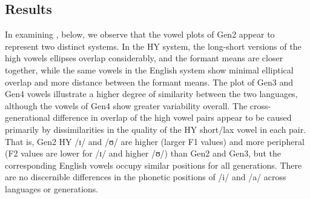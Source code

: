 \documentclass[output=paper]{langsci/langscibook}
\begin{document}
 
 \subsection{Results}
\label{sec:nove:4.3}

In examining , below, we observe that the vowel plots of Gen2 appear to represent two distinct systems. In the HY system, the long-short versions of the high vowels ellipses overlap considerably, and the formant means are closer together, while the same vowels in the English system show minimal elliptical overlap and more distance between the formant means. The plot of Gen3 and Gen4 vowels illustrate a higher degree of similarity between the two languages, although the vowels of Gen4 show greater variability overall. The cross-generational difference in overlap of the high vowel pairs appear to be caused primarily by dissimilarities in the quality of the HY short/lax vowel in each pair. That is, Gen2 HY /ɪ/ and /ʊ/ are higher (larger F1 values) and more peripheral (F2 values are lower for /ɪ/ and higher /ʊ/) than Gen2 and Gen3, but the corresponding English vowels occupy similar positions for all generations. There are no discernible differences in the phonetic positions of /i/ and /a/ across languages or generations. 
\end{document}

